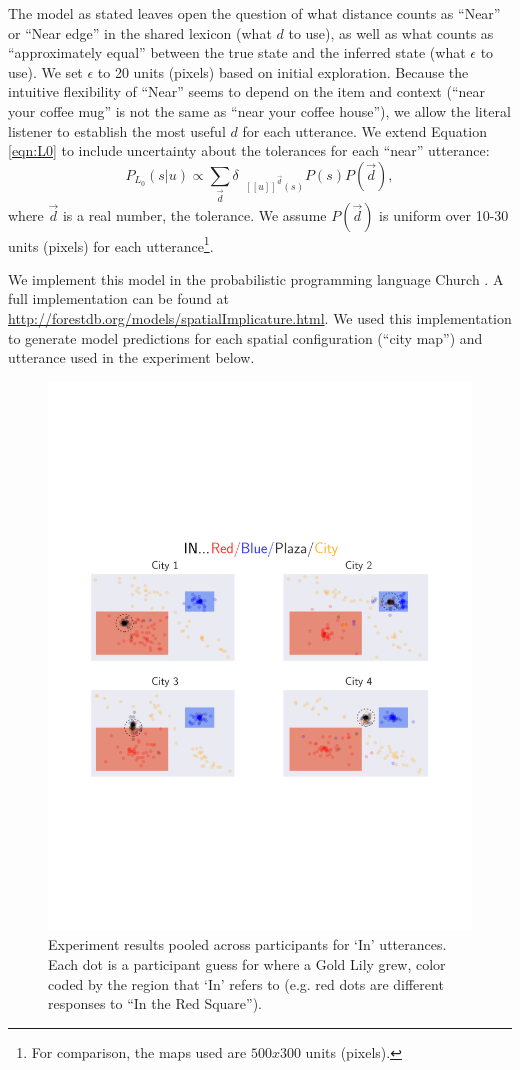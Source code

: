 \documentclass[10pt,letterpaper]{article}
\newcommand{\denote}[1]{\mbox{ $[\![ #1 ]\!]$}}
\begin{document}
The model as stated leaves open the question of what distance counts as ``Near'' or ``Near edge'' in the shared lexicon (what $d$ to use), as well as what counts as ``approximately equal'' between the true state and the inferred state (what $\epsilon$ to use). We set $\epsilon$ to 20 units (pixels) based on initial exploration. Because the intuitive flexibility of ``Near'' seems to depend on the item and context (``near your coffee mug'' is not the same as ``near your coffee house''), we allow the literal listener to establish the most useful $d$ for each utterance.
We extend Equation \ref{eqn:L0} to include uncertainty about the tolerances for each ``near'' utterance:
\begin{equation}
P_{L_0}(s|u)\propto \sum_{\vec{d}} \delta_{\denote{u}^{\vec{d}}(s)} P(s) P(\vec{d})\label{eqn:L0tol},
\end{equation}
where $\vec{d}$ is a real number, the tolerance. We assume $P(\vec{d})$ is uniform over 10-30 units (pixels) for each utterance\footnote{For comparison, the maps used are $500x300$ units (pixels).}. 

We implement this model in the probabilistic programming language Church \cite{goodman2012church}. A full implementation can be found at \url{http://forestdb.org/models/spatialImplicature.html}. We used this implementation to generate model predictions for each spatial configuration (``city map'') and utterance used in the experiment below.

\begin{figure}[!t]
\center
\includegraphics[width=.7\textwidth]{figures/In.pdf}
\caption{Experiment results pooled across participants for `In' utterances. Each dot is a participant guess for where a Gold Lily grew, color coded by the region that `In' refers to (e.g. red dots are different responses to ``In the Red Square'').}
\label{fig:In}
\end{figure}
\end{document}
